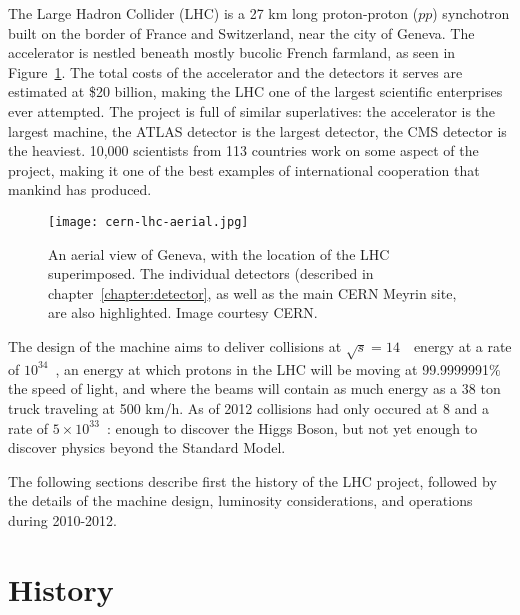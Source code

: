 \label{chapter:lhc}

The Large Hadron Collider (LHC) is a 27 km long proton-proton ($pp$) synchotron built on the border of France and Switzerland, near the city of Geneva. The accelerator is nestled beneath mostly bucolic French farmland, as seen in Figure~\ref{fig:lhc:cern-lhc-aerial}. The total costs of the accelerator and the detectors it serves are estimated at \$20 billion, making the LHC one of the largest scientific enterprises ever attempted.  The project is full of similar superlatives: the accelerator is the largest machine, the ATLAS detector is the largest detector, the CMS detector is the heaviest. 10,000 scientists from 113 countries work on some aspect of the project, making it one of the best examples of international cooperation that mankind has produced.


\begin{figure}
\centering
\texttt{[image: cern-lhc-aerial.jpg]}
\label{fig:lhc:cern-lhc-aerial}
\caption{An aerial view of Geneva, with the location of the LHC superimposed. The individual detectors (described in chapter~\ref{chapter:detector}, as well as the main CERN Meyrin site, are also highlighted. Image courtesy CERN.}
\end{figure}


The design of the machine aims to deliver collisions at $\sqrt{s} = 14$~\TeV~energy at a rate of $10^{34}$~\lumirate, an energy at which protons in the LHC will be moving at 99.9999991$\%$ the speed of light, and where the beams will contain as much energy as a 38 ton truck traveling at 500 km/h.  As of 2012 collisions had only occured at 8 \TeV and a rate of $5\times10^{33}$~\lumirate: enough to discover the Higgs Boson, but not yet enough to discover physics beyond the Standard Model.

The following sections describe first the history of the LHC project, followed by the details of the machine design, luminosity considerations, and operations during 2010-2012.

\section{History}
\label{lhc:history}

